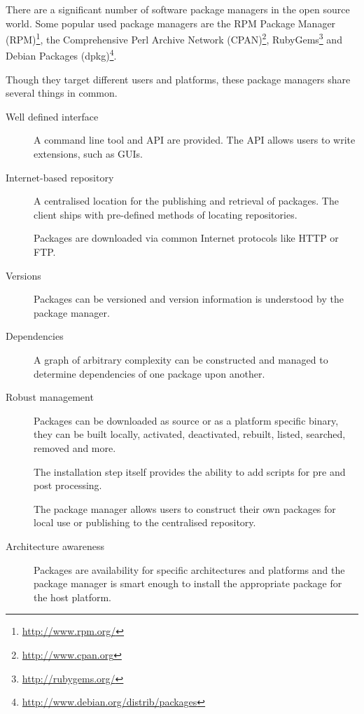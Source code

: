 \documentclass[11pt]{article}
\begin{document}
{There are a significant number of software package managers in the open source
world. Some popular used package managers are the
RPM Package Manager (RPM)\footnote{\url{http://www.rpm.org/}}, 
the Comprehensive Perl Archive Network
(CPAN)\footnote{\url{http://www.cpan.org}},
RubyGems\footnote{\url{http://rubygems.org/}} and
Debian Packages (dpkg)\footnote{\url{http://www.debian.org/distrib/packages}}.

Though they target different users and platforms, these package managers share
several things in common.

\begin{description}
	\item[Well defined interface] A command line tool and API are provided.
	The API allows users to write extensions, such as GUIs.

	\item[Internet-based repository] A centralised location for the publishing
	and retrieval of packages. The client ships with pre-defined methods of
	locating repositories.

	Packages are downloaded via common Internet protocols like HTTP or FTP.

	\item[Versions] Packages can be versioned and version information is
	understood by the package manager.

	\item[Dependencies] A graph of arbitrary complexity can be constructed and
	managed to determine dependencies of one package upon another.

	\item[Robust management] Packages can be downloaded as source or as a
	platform specific binary, they can be built locally, activated, deactivated,
	rebuilt, listed, searched, removed and more.
	
	The installation step itself provides the ability to add scripts for pre and
	post processing.

	The package manager allows users to construct their own packages for local
	use or publishing to the centralised repository.

	\item[Architecture awareness] Packages are availability for specific
	architectures and platforms and the package manager is smart enough to
	install the appropriate package for the host platform.

\end{description}

\ifx\pdfoutput\undefined %
\else
{}
\fi

}
\end{document}
